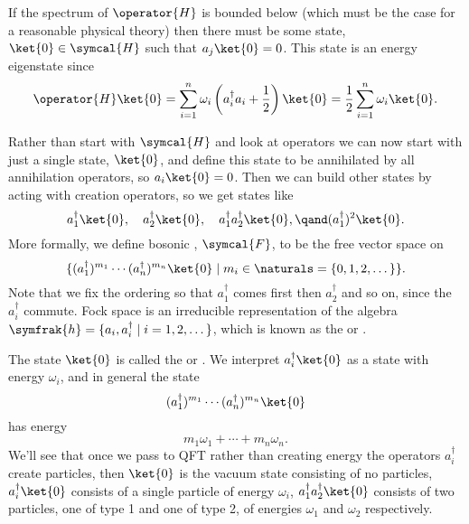 \documentclass[fleqn]{NotesClass}
\newcommand{\hilbertSpace}{\symcal{H}}
\newcommand{\hermit}{{\dagger}}
\newcommand{\fockSpace}{\symcal{F}}
\newcommand{\bosonAlgebra}{\symfrak{h}}
\begin{document}
    If the spectrum of \(\operator{H}\) is bounded below (which must be the case for a reasonable physical theory) then there must be some state, \(\ket{0} \in \hilbertSpace\) such that \(a_j\ket{0} = 0\).
    This state is an energy eigenstate since
    \begin{equation}
        \operator{H}\ket{0} = \sum_{i=1}^n \omega_i\left( a_i^\hermit a_i + \frac{1}{2} \right)\ket{0} = \frac{1}{2}\sum_{i=1}^n \omega_i \ket{0}.
    \end{equation}
    
    Rather than start with \(\hilbertSpace\) and look at operators we can now start with just a single state, \(\ket{0}\), and define this state to be annihilated by all annihilation operators, so \(a_i\ket{0} = 0\).
    Then we can build other states by acting with creation operators, so we get states like
    \begin{equation}
        a_1^\hermit \ket{0}, \quad a_2^\hermit \ket{0}, \quad a_1^\hermit a_2^\hermit \ket{0}, \qand (a_1^\hermit)^2 \ket{0}.
    \end{equation}
    More formally, we define bosonic , \(\fockSpace\), to be the free vector space on
    \begin{equation}
        \{(a_1^{\hermit})^{m_1} \dotsm (a_n^{\hermit})^{m_n}\ket{0} \mid m_i \in \naturals = \{0, 1, 2, \dotsc\}\}.
    \end{equation}
    Note that we fix the ordering so that \(a_1^{\hermit}\) comes first then \(a_2^{\hermit}\) and so on, since the \(a_i^{\hermit}\) commute.
    Fock space is an irreducible representation of the algebra \(\bosonAlgebra = \{a_i, a_i^{\hermit} \mid i = 1, 2, \dotsc\}\), which is known as the  or .
    
    The state \(\ket{0}\) is called the  or .
    We interpret \(a_i^{\hermit}\ket{0}\) as a state with energy \(\omega_i\), and in general the state
    \begin{equation}
        (a_1^{\hermit})^{m_1} \dotsb (a_n^{\hermit})^{m_n} \ket{0}
    \end{equation}
    has energy
    \begin{equation}
        m_1\omega_1 + \dotsb + m_n\omega_n.
    \end{equation}
    We'll see that once we pass to QFT rather than creating energy the operators \(a_i^{\hermit}\) create particles, then \(\ket{0}\) is the vacuum state consisting of no particles, \(a_i^{\hermit}\ket{0}\) consists of a single particle of energy \(\omega_i\), \(a_1^{\hermit}a_2^{\hermit}\ket{0}\) consists of two particles, one of type 1 and one of type 2, of energies \(\omega_1\) and \(\omega_2\) respectively.
    
\end{document}
